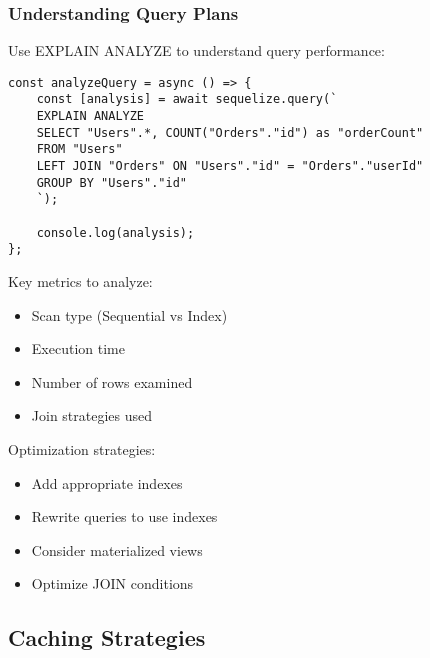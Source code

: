\documentclass[12pt,a4paper]{book}
\begin{document}
	\subsubsection{Understanding Query Plans}
	\begin{tcolorbox}[title=Analyzing Query Execution]
		Use EXPLAIN ANALYZE to understand query performance:
		
		\begin{verbatim}
const analyzeQuery = async () => {
	const [analysis] = await sequelize.query(`
	EXPLAIN ANALYZE
	SELECT "Users".*, COUNT("Orders"."id") as "orderCount"
	FROM "Users"
	LEFT JOIN "Orders" ON "Users"."id" = "Orders"."userId"
	GROUP BY "Users"."id"
	`);
	
	console.log(analysis);
};
		\end{verbatim}
		
		Key metrics to analyze:
		\begin{itemize}
			\item Scan type (Sequential vs Index)
			\item Execution time
			\item Number of rows examined
			\item Join strategies used
		\end{itemize}
		
		Optimization strategies:
		\begin{itemize}
			\item Add appropriate indexes
			\item Rewrite queries to use indexes
			\item Consider materialized views
			\item Optimize JOIN conditions
		\end{itemize}
	\end{tcolorbox}
	
	\subsection{Caching Strategies}
	
\end{document}

